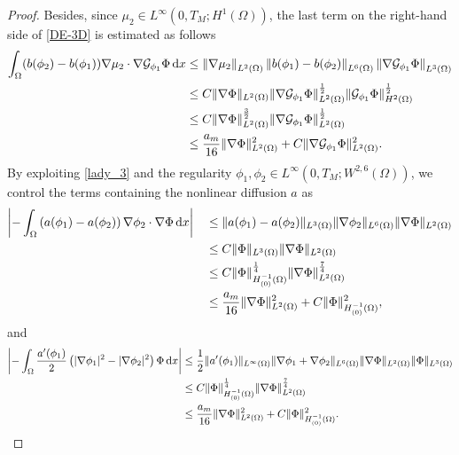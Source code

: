 \documentclass[11pt,reqno]{amsart}
\theoremstyle{remark}
\newcommand \norm[1] {\left\Vert #1\right\Vert}
\def\G{\mathcal{G}}
\def\d{{\rm d}}
\def\vphi{\varphi}
\numberwithin{equation}{section}
\def\d{{\rm d}}
\begin{document}
\begin{proof}
Besides, since $\mu_2\in L^\infty(0,T_M;H^1(\Omega))$, the last term on the right-hand side of \eqref{DE-3D} is estimated as follows
\begin{align*}
\int_\Omega (b(\phi_2)-b(\phi_1)) \nabla \mu_2 \cdot \nabla \G_{\phi_1} \Phi \, \d x
 &\leq  \norm{\nabla \mu_2}_{L^2(\Omega)} \norm{b(\phi_1)-b(\phi_2)}_{L^6(\Omega)}
  \norm{\nabla \mathcal{G}_{\phi_1}\Phi}_{L^3(\Omega)}
\\
&\leq
C \| \nabla\Phi\|_{L^2(\Omega)} \|\nabla \G_{\phi_1} \Phi\|_{L^2(\Omega)}^\frac12\|\G_{\phi_1} \Phi\|_{H^2(\Omega)}^\frac12\\
&\leq
C \| \nabla\Phi\|_{L^2(\Omega)}^\frac32 \|\nabla \G_{\phi_1} \Phi\|_{L^2(\Omega)}^\frac12\\
 &\leq \frac{a_m}{16}  \| \nabla \Phi\|_{L^2(\Omega)}^2
 + C\| \nabla \mathcal{G}_{\phi_1} \Phi\|_{L^2(\Omega)}^2.
 \end{align*}
By exploiting \eqref{lady_3} and the regularity $\phi_1,\phi_2\in L^\infty(0,T_M; W^{2,6}(\Omega))$, we control the terms containing the nonlinear diffusion $a$ as 
\begin{align*}
\left|  - \int_\Omega \left( a(\phi_1)-a(\phi_2)\right) \nabla \phi_2 \cdot \nabla \Phi \, \d x \right|
&\quad\leq \| a(\phi_1)-a(\phi_2)\|_{L^3(\Omega)} \| \nabla \phi_2\|_{L^6(\Omega)}
\| \nabla \Phi\|_{L^2(\Omega)}
\\
&\quad\leq C \| \Phi\|_{L^3(\Omega)}
\| \nabla \Phi\|_{L^2(\Omega)}
\\
&\quad\leq C \| \Phi\|_{H^{-1}_{(0)}(\Omega)}^\frac14
 \| \nabla \Phi\|_{L^2(\Omega)}^\frac74
\\
&\quad \leq \frac{a_m}{16}\| \nabla \Phi\|_{L^2(\Omega)}^2
+C  \| \Phi\|_{H^{-1}_{(0)}(\Omega)}^2,
\end{align*}
and
\begin{align*}
\left| -\int_\Omega \frac{a'(\phi_1)}{2}  \left( |\nabla \phi_1|^2-|\nabla \phi_2|^2\right)\Phi
\, \d x\right|
&\leq \frac12 \| a'(\phi_1)\|_{L^\infty(\Omega)}\|\nabla\phi_1+\nabla\phi_2\|_{L^6(\Omega)}  \| \nabla \Phi\|_{L^2(\Omega)} \| \Phi\|_{L^3(\Omega)}
\\
&\leq C\|\Phi\|_{H^{-1}_{(0)}(\Omega)}^{\frac14}\|\nabla \Phi\|^{\frac74}_{L^2(\Omega)}
\\
&\leq \frac{a_m}{16}\|\nabla \Phi\|^{2}_{L^2(\Omega)}+C\|\Phi\|_{H^{-1}_{(0)}(\Omega)}^{2}.

\end{align*}
\end{proof}
\end{document}
